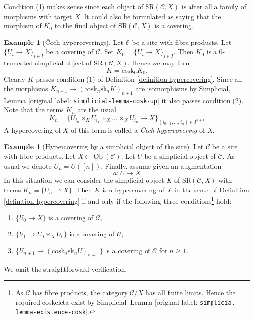 \documentclass[10pt,a4paper]{article}
\theoremstyle{plain}
\theoremstyle{definition}
\newtheorem{example}[subsection]{Example}
\theoremstyle{remark}
\numberwithin{equation}{subsection}
\def\Ob{\mathop{\mathrm{Ob}}\nolimits}
\begin{document}
\noindent
Condition (1) makes sense since each object of
$\text{SR}(\mathcal{C}, X)$ is after all a family
of morphisms with target $X$. It could also be
formulated as saying that the morphism of $K_0$ to
the final object of $\text{SR}(\mathcal{C}, X)$
is a covering.

\begin{example}[{\v C}ech hypercoverings]
\label{example-cech}
Let $\mathcal{C}$ be a site with fibre products.
Let $\{U_i \to X\}_{i \in I}$ be a covering of $\mathcal{C}$.
Set $K_0 = \{U_i \to X\}_{i \in I}$.
Then $K_0$ is a $0$-truncated simplicial object of
$\text{SR}(\mathcal{C}, X)$. Hence we may form
$$
K = \text{cosk}_0 K_0.
$$
Clearly $K$ passes condition (1) of Definition \ref{definition-hypercovering}.
Since all the morphisms $K_{n + 1} \to (\text{cosk}_n \text{sk}_n K)_{n + 1}$
are isomorphisms by
Simplicial, Lemma \textnormal{[original label: \nolinkurl{simplicial-lemma-cosk-up}]}
it also passes condition (2). Note that
the terms $K_n$ are the usual
$$
K_n = \{
U_{i_0} \times_X U_{i_1} \times_X \ldots \times_X U_{i_n} \to X
\}_{(i_0, i_1, \ldots, i_n) \in I^{n + 1}}
$$
A hypercovering of $X$ of this form is called a
{\it {\v C}ech hypercovering} of $X$.
\end{example}

\begin{example}[Hypercovering by a simplicial object of the site]
\label{example-hypercovering-in-C}
Let $\mathcal{C}$ be a site with fibre products. Let
$X \in \Ob(\mathcal{C})$. Let $U$ be a simplicial object of $\mathcal{C}$.
As usual we denote $U_n = U([n])$. Finally, assume given an augmentation
$$
a : U \to X
$$
In this situation we can consider the simplicial object $K$
of $\text{SR}(\mathcal{C}, X)$ with terms $K_n = \{U_n \to X\}$.
Then $K$ is a hypercovering of $X$ in the sense of
Definition \ref{definition-hypercovering}
if and only if the following three
conditions\footnote{As $\mathcal{C}$ has fibre products, the
category $\mathcal{C}/X$ has all finite limits.
Hence the required coskeleta exist by
Simplicial, Lemma \textnormal{[original label: \nolinkurl{simplicial-lemma-existence-cosk}]}.} hold:
\begin{enumerate}
\item $\{U_0 \to X\}$ is a covering of $\mathcal{C}$,
\item $\{U_1 \to U_0 \times_X U_0\}$ is a covering of $\mathcal{C}$,
\item $\{U_{n + 1} \to (\text{cosk}_n\text{sk}_n U)_{n + 1}\}$
is a covering of $\mathcal{C}$ for $n \geq 1$.
\end{enumerate}
We omit the straightforward verification.
\end{example}
\end{document}
